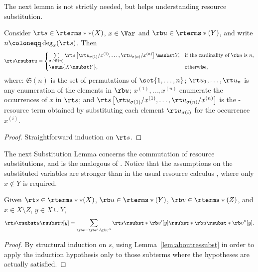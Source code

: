 The next lemma is not strictly needed, but helps understanding resource substitution.

\begin{lemma}\label{lem:aboutressubst}
	Consider $\rt s \in \rterms**(X)$, $x \in \Var$ and
	$\rb u \in \rterms*(Y)$,
	and write $n \coloneqq \deg_x(\rt s)$. Then
	\[	\rt s \rsubst u = 
		\begin{cases}
		\sum\limits_{\sigma \in \mathfrak{S}(n)}
			\rt s\left[ \rt u_{\sigma(1)}/x^{(1)}, \dots, 
			\rt u_{\sigma(n)}/x^{(n)} \right] \msubst Y,
			& \text{if the cardinality of $\rb u$ is $n$,} \\
		\esum {X \msubst Y}, & \text{otherwise,}\\
		\end{cases} 
	\]
	where: $\mathfrak{S}(n)$ is the set of permutations of $\set{1,\dots,n}$;
	$\rt u_1,\dots,\rt u_n$ is any enumeration of the elements in $\rb u$;
	$x^{(1)},\dots,x^{(n)}$ enumerate the occurrences of $x$ in $\rt s$; and
	$\rt s\left[ \rt u_{\sigma(1)}/x^{(1)}, \dots, \rt u_{\sigma(n)}/x^{(n)} \right]$
	is the \lamI-resource term obtained by substituting each element $\rt u_{\sigma(i)}$ for the occurrence $x^{(i)}$.
\end{lemma}
	
	\begin{proof}
	Straightforward induction on $\rt s$.
	\end{proof}

The next Substitution Lemma concerns the commutation of resource substitutions, and is the analogous of \cite[Lemma~2.1.16]{Bare}.
Notice that the assumptions on the substituted variables
are stronger than in the usual resource calculus
\cite[Lemma~2]{Ehrhard.Reg.08},
where only $x \notin Y$ is required.

\setcounter{lem:resource-substitution}{\thetheorem}
\begin{lemma}
\label{lem:resource-substitution}
	Given $\rt s \in \rterms**(X)$,
	$\rb u \in \rterms*(Y)$,
	$\rb v \in \rterms*(Z)$,
	and
	$x \in X \setminus Z$, $y \in X \cup Y$,
	\[	\rt s \rsubst u \rsubst v [y] =
		\sum_{\rb v = \rb v' \cdot \rb v''} \rt s \rsubst* {\rb v'} [y]
		\rsubst*{ \rb u \rsubst* {\rb v''}[y] }. \]
\end{lemma}
\begin{proof} By structural induction on $s$, using Lemma~\ref{lem:aboutressubst} in order to apply the induction hypothesis only to those subterms where the hypotheses are actually satisfied.
\end{proof}

